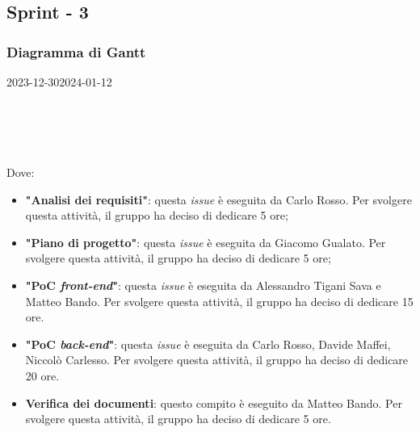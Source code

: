 \subsection{Sprint - 3}

\subsubsection{Diagramma di Gantt}

\begin{ganttchart}[
		x unit=0.6cm, %
		y unit chart=0.6cm,
		bar/.style={fill=blue!50},
		bar height=0.5,
		time slot format=isodate,
		time slot unit=day,
		vgrid,
		today=2024-01-8,
		today rule/.style={draw=red, ultra thick}
	]{2023-12-30}{2024-01-12}
	 \\
	 \\
	 \\
	 \\
	 \\
\end{ganttchart}

Dove:
\begin{itemize}
	\item \textbf{"Analisi dei requisiti"}: questa \textit{issue} è eseguita da
	      Carlo Rosso. Per svolgere questa attività, il gruppo ha deciso di
	      dedicare 5 ore;

	\item \textbf{"Piano di progetto"}: questa \textit{issue} è eseguita da
	      Giacomo Gualato. Per svolgere questa attività, il gruppo ha deciso
	      di dedicare 5 ore;

	\item \textbf{"PoC \textit{front-end}"}: questa \textit{issue} è eseguita
	      da Alessandro Tigani Sava e Matteo Bando. Per svolgere questa
	      attività, il gruppo ha deciso di dedicare 15 ore.

	\item \textbf{"PoC \textit{back-end}"}: questa \textit{issue} è eseguita
	      da Carlo Rosso, Davide Maffei, Niccolò Carlesso. Per svolgere questa
	      attività, il gruppo ha deciso di dedicare 20 ore.

	\item \textbf{Verifica dei documenti}: questo compito è eseguito da
	      Matteo Bando. Per svolgere questa attività, il gruppo ha deciso
	      di dedicare 5 ore.
\end{itemize}

